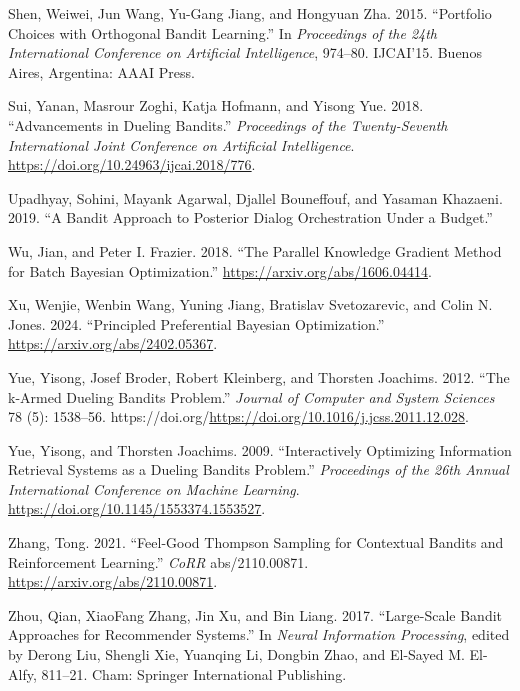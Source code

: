 \documentclass[
  letterpaper,
  numbers=noenddot,
  DIV=11]{scrreprt}
\newlength{\cslhangindent}
\newenvironment{CSLReferences}[2] %
 {\begin{list}{}{%
  \setlength{\itemindent}{0pt}
  \setlength{\leftmargin}{0pt}
  \setlength{\parsep}{0pt}
  \ifodd #1
   \setlength{\leftmargin}{\cslhangindent}
   \setlength{\itemindent}{-1\cslhangindent}
  \fi
  \setlength{\itemsep}{#2\baselineskip}}}
 {\end{list}}
\theoremstyle{plain}
\theoremstyle{definition}
\theoremstyle{plain}
\theoremstyle{remark}
\begin{document}
\begin{CSLReferences}{1}{0}
Shen, Weiwei, Jun Wang, Yu-Gang Jiang, and Hongyuan Zha. 2015.
{``Portfolio Choices with Orthogonal Bandit Learning.''} In
\emph{Proceedings of the 24th International Conference on Artificial
Intelligence}, 974--80. IJCAI'15. Buenos Aires, Argentina: AAAI Press.

Sui, Yanan, Masrour Zoghi, Katja Hofmann, and Yisong Yue. 2018.
{``Advancements in Dueling Bandits.''} \emph{Proceedings of the
Twenty-Seventh International Joint Conference on Artificial
Intelligence}. \url{https://doi.org/10.24963/ijcai.2018/776}.

Upadhyay, Sohini, Mayank Agarwal, Djallel Bouneffouf, and Yasaman
Khazaeni. 2019. {``A Bandit Approach to Posterior Dialog Orchestration
Under a Budget.''}

Wu, Jian, and Peter I. Frazier. 2018. {``The Parallel Knowledge Gradient
Method for Batch Bayesian Optimization.''}
\url{https://arxiv.org/abs/1606.04414}.

Xu, Wenjie, Wenbin Wang, Yuning Jiang, Bratislav Svetozarevic, and Colin
N. Jones. 2024. {``Principled Preferential Bayesian Optimization.''}
\url{https://arxiv.org/abs/2402.05367}.

Yue, Yisong, Josef Broder, Robert Kleinberg, and Thorsten Joachims.
2012. {``The k-Armed Dueling Bandits Problem.''} \emph{Journal of
Computer and System Sciences} 78 (5): 1538--56.
https://doi.org/\url{https://doi.org/10.1016/j.jcss.2011.12.028}.

Yue, Yisong, and Thorsten Joachims. 2009. {``Interactively Optimizing
Information Retrieval Systems as a Dueling Bandits Problem.''}
\emph{Proceedings of the 26th Annual International Conference on Machine
Learning}. \url{https://doi.org/10.1145/1553374.1553527}.

Zhang, Tong. 2021. {``Feel-Good Thompson Sampling for Contextual Bandits
and Reinforcement Learning.''} \emph{CoRR} abs/2110.00871.
\url{https://arxiv.org/abs/2110.00871}.

Zhou, Qian, XiaoFang Zhang, Jin Xu, and Bin Liang. 2017. {``Large-Scale
Bandit Approaches for Recommender Systems.''} In \emph{Neural
Information Processing}, edited by Derong Liu, Shengli Xie, Yuanqing Li,
Dongbin Zhao, and El-Sayed M. El-Alfy, 811--21. Cham: Springer
International Publishing.

\end{CSLReferences}
\end{document}
